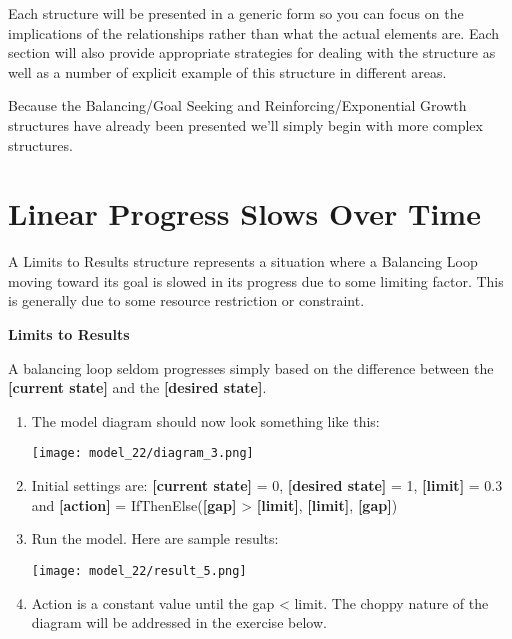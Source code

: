 \documentclass[]{memoir}
\makeatletter
\def\maxwidth{\ifdim\Gin@nat@width>\linewidth\linewidth
\else\Gin@nat@width\fi}
\let\Oldincludegraphics\includegraphics
\renewcommand{\includegraphics}[1]{\Oldincludegraphics[width=\maxwidth]{#1}}
\newcommand{\p}[1]{\textbf{{[}#1{]}}}
\makeatother
\begin{document}
Each structure will be presented in a generic form so you can focus on
the implications of the relationships rather than what the actual
elements are. Each section will also provide appropriate strategies for
dealing with the structure as well as a number of explicit example of
this structure in different areas.

Because the Balancing/Goal Seeking and Reinforcing/Exponential Growth
structures have already been presented we'll simply begin with more
complex structures.

\section{Linear Progress Slows Over Time}

A Limits to Results structure represents a situation where a Balancing
Loop moving toward its goal is slowed in its progress due to some
limiting factor. This is generally due to some resource restriction or
constraint.

\FloatBarrier 

\begin{oframed}\textbf{Limits to Results} 

 A balancing loop seldom progresses simply based on the difference between the \p{current state} and the \p{desired state}.

\begin{enumerate}
\item The model diagram should now look something like this: \par \begin{minipage}{\linewidth}  \centering \texttt{[image: model\_22/diagram\_3.png]}
\end{minipage}
\item 

Initial settings are: \p{current state} = 0, \p{desired state} = 1, \p{limit} = 0.3 and \p{action} = IfThenElse(\p{gap} > \p{limit}, \p{limit}, \p{gap})


\item Run the model. Here are sample results:\par \begin{minipage}{\linewidth}  \centering \texttt{[image: model\_22/result\_5.png]}
\end{minipage}
\item 

 Action is a constant value until the gap < limit. The choppy nature of the diagram will be addressed in the exercise below.



\end{enumerate} \end{oframed}
\end{document}

